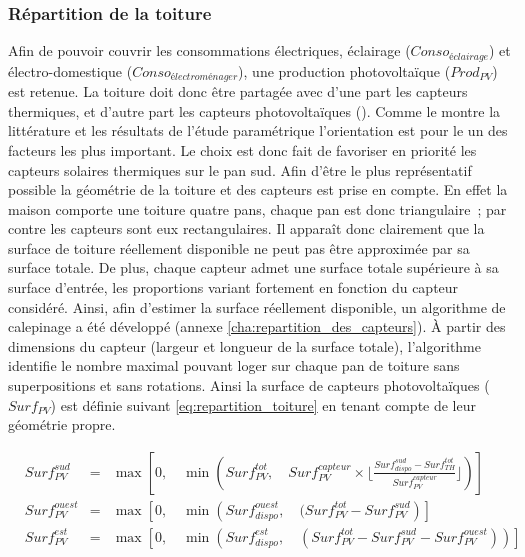 \subsubsection{Répartition de la toiture} %
\label{ssub:repartition_de_la_toiture}
Afin de pouvoir couvrir les consommations électriques, éclairage ($Conso_{éclairage}$) et
électro-domestique ($Conso_{électroménager}$), une production photovoltaïque ($Prod_{PV}$)
est retenue. La toiture doit donc être partagée avec d’une part les capteurs thermiques, et
d’autre part les capteurs photovoltaïques (). Comme le montre la littérature et les résultats
de l’étude paramétrique l’orientation est pour le  un des facteurs les plus
important. Le choix est donc fait de favoriser en priorité les capteurs solaires
thermiques sur le pan sud. Afin d’être le plus représentatif possible la géométrie
de la toiture et des capteurs est prise en compte.
En effet la maison comporte une toiture quatre pans, chaque pan est donc triangulaire~; par
contre les capteurs sont eux rectangulaires. Il apparaît donc clairement que la surface
de toiture réellement disponible ne peut pas être approximée par sa surface totale.
De plus, chaque capteur admet une surface totale supérieure à sa surface d’entrée,
les proportions variant fortement en fonction du capteur considéré.
Ainsi, afin d’estimer la surface réellement disponible, un algorithme de calepinage
a été développé (annexe \ref{cha:repartition_des_capteurs}). À partir des dimensions
du capteur (largeur et longueur de la surface totale), l’algorithme identifie le
nombre maximal pouvant loger sur chaque pan de toiture sans superpositions et sans rotations.
Ainsi la surface de capteurs photovoltaïques ($Surf_{PV}$) est définie suivant
\eqref{eq:repartition_toiture} en tenant compte de leur géométrie propre.

\begin{equation}\label{eq:repartition_toiture}
  \begin{aligned}
    &Surf_{PV}^{sud}   &=& \max\left[0,\quad \min \left(Surf_{PV}^{tot},\quad Surf_{PV}^{capteur} \times
                                                      \Bigg\lfloor\frac{Surf_{dispo}^{sud} - Surf_{TH}^{tot}}{Surf_{PV}^{capteur}}\Bigg\rfloor\right)
                                   \right] \\
    &Surf_{PV}^{ouest} &=& \max \left[0,\quad \min\left(Surf_{dispo}^{ouest},\quad
                                                      (Surf_{PV}^{tot} - Surf_{PV}^{sud}\right)
                                    \right] \\
    &Surf_{PV}^{est} &=& \max \left[0,\quad \min\left(Surf_{dispo}^{est},\quad
                                                    (Surf_{PV}^{tot} - Surf_{PV}^{sud} - Surf_{PV}^{ouest}) \right) \right] \\
  \end{aligned}
\end{equation}


